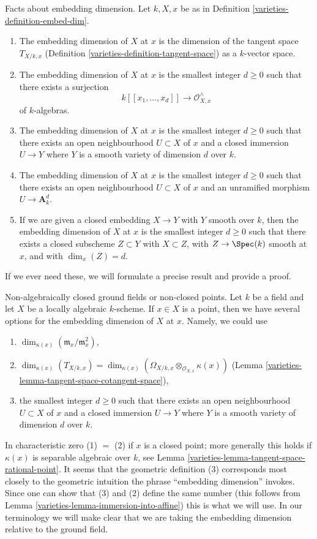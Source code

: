 Facts about embedding dimension.
Let $k, X, x$ be as in Definition \ref{varieties-definition-embed-dim}.
\begin{enumerate}
\item The embedding dimension of $X$ at $x$ is
the dimension of
the tangent space $T_{X/k, x}$ (Definition \ref{varieties-definition-tangent-space})
as a $k$-vector space.
\item The embedding dimension of $X$ at $x$ is the smallest integer
$d \geq 0$ such that there exists a surjection
$$
k[[x_1, \ldots, x_d]] \longrightarrow \mathcal{O}_{X, x}^\wedge
$$
of $k$-algebras.
\item The embedding dimension of $X$ at $x$ is the smallest integer
$d \geq 0$ such that there exists an open neighbourhood $U \subset X$
of $x$ and a closed immersion $U \to Y$ where $Y$ is a smooth variety
of dimension $d$ over $k$.
\item The embedding dimension of $X$ at $x$ is the smallest integer
$d \geq 0$ such that there exists an open neighbourhood $U \subset X$
of $x$ and an unramified morphism $U \to \mathbf{A}^d_k$.
\item If we are given a closed embedding $X \to Y$ with $Y$ smooth
over $k$, then the embedding dimension of $X$ at $x$ is the smallest
integer $d \geq 0$ such that there exists a closed subscheme $Z \subset Y$
with $X \subset Z$, with $Z \to \Spec(k)$ smooth at $x$, and with
$\dim_x(Z) = d$.
\end{enumerate}
If we ever need these, we will formulate a precise result and provide
a proof.

\medskip\noindent
Non-algebraically closed ground fields or non-closed points.
Let $k$ be a field and let $X$ be a locally algebraic $k$-scheme.
If $x \in X$ is a point, then we have several options for the
embedding dimension of $X$ at $x$. Namely, we could use
\begin{enumerate}
\item $\dim_{\kappa(x)}(\mathfrak m_x/\mathfrak m_x^2)$,
\item $\dim_{\kappa(x)}(T_{X/k, x}) =
\dim_{\kappa(x)}(\Omega_{X/k, x} \otimes_{\mathcal{O}_{X, x}} \kappa(x))$
(Lemma \ref{varieties-lemma-tangent-space-cotangent-space}),
\item the smallest integer $d \geq 0$ such that there exists an
open neighbourhood $U \subset X$ of $x$ and a closed immersion
$U \to Y$ where $Y$ is a smooth variety of dimension $d$ over $k$.
\end{enumerate}
In characteristic zero (1) $=$ (2) if $x$ is a closed point;
more generally this holds if $\kappa(x)$ is separable algebraic
over $k$, see
Lemma \ref{varieties-lemma-tangent-space-rational-point}.
It seems that the geometric
definition (3) corresponds most closely to the geometric
intuition the phrase ``embedding dimension'' invokes.
Since one can show that (3) and (2) define the same number
(this follows from Lemma \ref{varieties-lemma-immersion-into-affine})
this is what we will use.
In our terminology we will make clear that we are
taking the embedding dimension relative to the ground field.


